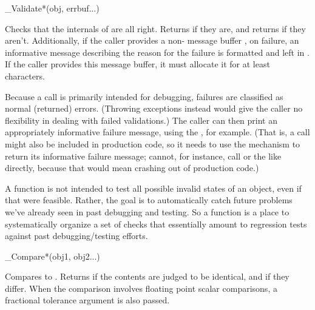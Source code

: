 \begin{sreapi}
\hypertarget{ifc:Validate}
{\item[\_Validate*(obj, errbuf...)]}

Checks that the internals of  are all right. Returns
 if they are, and returns  if they
aren't. Additionally, if the caller provides a non-
message buffer , on failure, an informative message
describing the reason for the failure is formatted and left in
. If the caller provides this message buffer, it must
allocate it for at least  characters.

Because a  call is primarily intended for
debugging, failures are classified as normal (returned) errors.
(Throwing exceptions instead would give the caller no flexibility in
dealing with failed validations.) The caller can then print an
appropriately informative failure message, using the ,
for example. (That is, a  call might also be
included in production code, so it needs to use the 
mechanism to return its informative failure message;
 cannot, for instance, call 
or the like directly, because that would mean crashing out of
production code.)

A  function is not intended to test all possible
invalid states of an object, even if that were feasible. Rather, the
goal is to automatically catch future problems we've already seen in
past debugging and testing. So a  function is a
place to systematically organize a set of checks that essentially
amount to regression tests against past debugging/testing efforts.

\hypertarget{ifc:Compare}
{\item[\_Compare*(obj1, obj2...)]}

Compares  to . Returns  if the
contents are judged to be identical, and  if they
differ. When the comparison involves floating point scalar
comparisons, a fractional tolerance argument  is also
passed. 


\end{sreapi}
